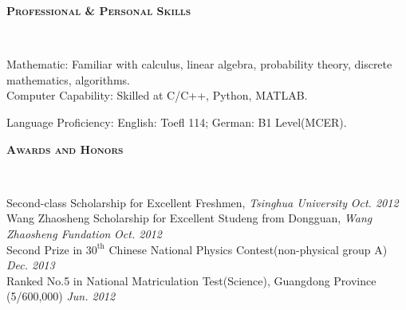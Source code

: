 \documentclass[a4paper]{article}
\newenvironment{changemargin}[2]{%
  \begin{list}{}{%
    \setlength{\topsep}{0pt}%
    \setlength{\leftmargin}{#1}%
    \setlength{\rightmargin}{#2}%
    \setlength{\listparindent}{\parindent}%
    \setlength{\itemindent}{\parindent}%
    \setlength{\parsep}{\parskip}%
  }%
  \item[]}{\end{list}
}
\newcommand{\lineover}{
	\begin{changemargin}{-0.05in}{-0.05in}
		\vspace*{-8pt}
		\hrulefill \\
		\vspace*{-2pt}
	\end{changemargin}
}
\newcommand{\header}[1]{
	\begin{changemargin}{-0.5in}{-0.5in}
		\scshape{\textbf{#1}}\\
  	\lineover
	\end{changemargin}
}
\newenvironment{body} {
	\vspace*{-16pt}
	\begin{changemargin}{-0.25in}{-0.5in}
  }	
	{\end{changemargin}
}
\begin{document}
\begin{body}

\end{body}
\smallskip
\smallskip


\header{Professional \& Personal Skills}

\begin{body}
	\vspace{14pt}
	Mathematic: Familiar with calculus, linear algebra, probability theory, discrete mathematics, algorithms.\\
	\smallskip
	Computer Capability: Skilled at C/C++, Python, MATLAB.\\
	\smallskip

	Language Proficiency: English: Toefl 114; German: B1 Level(MCER).\\
\end{body}
\smallskip
\smallskip


\header{Awards and Honors}

\begin{body}
	\vspace{14pt}
	Second-class Scholarship for Excellent Freshmen, \emph{Tsinghua University} \hfill{} \emph{Oct. 2012}\\
	\smallskip
	Wang Zhaosheng Scholarship for Excellent Studeng from Dongguan, \emph{Wang Zhaosheng Fundation} \hfill{} \emph{Oct. 2012}\\
	\smallskip
	Second Prize in $30^{\mathrm{th}}$ Chinese National Physics Contest(non-physical group A) \hfill{} \emph{Dec. 2013}\\
	\smallskip
	Ranked No.5 in National Matriculation Test(Science), Guangdong Province (5/600,000) \hfill{} \emph{Jun. 2012}
\end{body}

\smallskip
\smallskip

\end{document}
